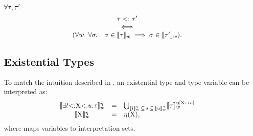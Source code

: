 \begin{theorem}
    $\forall \tau, \tau'.$
    \[
        \begin{array}{c}
            \tau <: \tau' \\
            \iff \\
            (\forall w.\ \forall \sigma.\quad \sigma \in \llbracket \tau \rrbracket_w \implies
                \sigma \in \llbracket \tau' \rrbracket_w).
        \end{array}
    \]
\end{theorem}

\subsection{Existential Types}

To match the intuition described in ,
an existential type and type variable can be interpreted as:
\[
\begin{array}{ccl}
    \llbracket \exists l{\operatorname{<:}}\mathrm{X}{\operatorname{<:}}u.\tau \rrbracket^{\eta}_w &=& 
        \bigcup_{\llbracket l \rrbracket^{\eta}_w\, \subseteq\, s\,
            \subseteq\, \llbracket u \rrbracket^{\eta}_w}
        \llbracket \tau \rrbracket^{\eta[\mathrm{X}\,\!\mapsto\!\,s]}_w \\
    \llbracket \mathrm{X} \rrbracket^{\eta}_w &=& \eta(\mathrm{X}), \\
\end{array}
\]
where %
\semsubstvars maps variables to interpretation sets.

